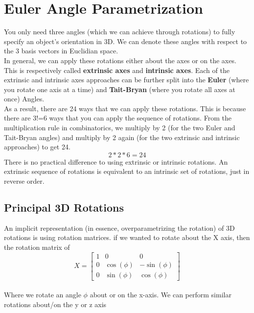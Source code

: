 \documentclass{article}
\begin{document}
\section{Euler Angle Parametrization}
You only need three angles (which we can achieve through rotations) to fully specify an object's orientation in 3D. We can denote these angles with respect to the 3
basis vectors in Euclidian space.\\

\noindent In general, we can apply these rotations either about the axes or on the axes. This is respectively
called \textbf{extrinsic axes} and \textbf{intrinsic axes}. Each of the extrinsic and intrinsic axes approaches can be further split
into the \textbf{Euler} (where you rotate one axis at a time) and \textbf{Tait-Bryan} (where you rotate all axes at once) Angles.\\

\noindent As a result, there are 24 ways that we can apply these rotations. This is because there are 3!=6 ways that you can apply the
sequence of rotations. From the multiplication rule in combinatorics, we multiply by 2 (for the two Euler and
Tait-Bryan angles) and multiply by 2 again (for the two extrinsic and intrinsic approaches) to get 24.
\begin{equation*}
	2*2*6=24
\end{equation*}
There is no practical difference to using extrinsic or intrinsic rotations. An extrinsic sequence of rotations is equivalent to an 
intrinsic set of rotations, just in reverse order.
\subsection*{Principal 3D Rotations}
An implicit representation (in essence, overparametrizing the rotation) of 3D rotations is using rotation matrices. if
we wanted to rotate about the X axis, then the rotation matrix of\\

\begin{equation*}
    X = 
    \begin{bmatrix}
    1 & 0 & 0 \\
    0 & \cos(\phi) & -\sin(\phi) \\
    0 & \sin(\phi) & \cos(\phi)
    \end{bmatrix}
\end{equation*}\\

\noindent Where we rotate an angle $\phi$ about or on the x-axis. We can perform similar rotations about/on the
y or z axis\\
\end{document}
